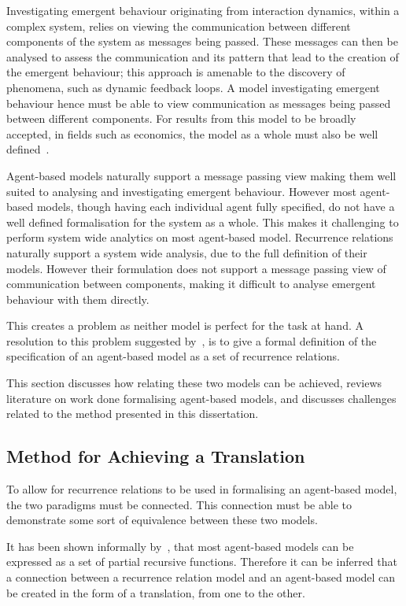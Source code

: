 \documentclass{article}
\begin{document}
Investigating emergent behaviour originating from interaction dynamics, within a complex system, relies on viewing the communication between different components of the system as messages being passed. These messages can then be analysed to assess the communication and its pattern that lead to the creation of the emergent behaviour; this approach is amenable to the discovery of phenomena, such as dynamic feedback loops. A model investigating emergent behaviour hence must be able to view communication as messages being passed between different components. For results from this model to be broadly accepted, in fields such as economics, the model as a whole must also be well defined~\cite{ebmabmi}.      

Agent-based models naturally support a message passing view making them well suited to analysing and investigating emergent behaviour. However most agent-based models, though having each individual agent fully specified, do not have a well defined formalisation for the system as a whole. This makes it challenging to perform system wide analytics on most agent-based model. Recurrence relations naturally support a system wide analysis, due to the full definition of their models. However their formulation does not support a message passing view of communication between components, making it difficult to analyse emergent behaviour with them directly. 

This creates a problem as neither model is perfect for the task at hand. A resolution to this problem suggested by~\cite{econmistsnoabm}, is to give a formal definition of the specification of an agent-based model as a set of recurrence relations. 

This section discusses how relating these two models can be achieved, reviews literature on work done formalising agent-based models, and discusses challenges related to the method presented in this dissertation.  


\subsection{Method for Achieving a Translation}
To allow for recurrence relations to be used in formalising an agent-based model, the two paradigms must be connected. This connection must be able to demonstrate some sort of equivalence between these two models. 

It has been shown informally by~\cite{gabm3}, that most agent-based models can be expressed as a set of partial recursive functions. Therefore it can be inferred that a connection between a recurrence relation model and an agent-based model can be created in the form of a translation, from one to the other. 
\end{document}
